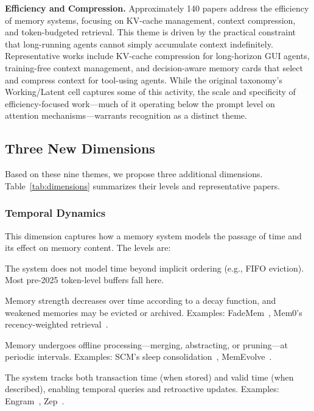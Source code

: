 \textbf{Efficiency and Compression.} Approximately 140 papers address the efficiency of memory systems, focusing on KV-cache management, context compression, and token-budgeted retrieval. This theme is driven by the practical constraint that long-running agents cannot simply accumulate context indefinitely. Representative works include KV-cache compression for long-horizon GUI agents, training-free context management, and decision-aware memory cards that select and compress context for tool-using agents. While the original taxonomy's Working/Latent cell captures some of this activity, the scale and specificity of efficiency-focused work---much of it operating below the prompt level on attention mechanisms---warrants recognition as a distinct theme.

\subsection{Three New Dimensions}

Based on these nine themes, we propose three additional dimensions. Table~\ref{tab:dimensions} summarizes their levels and representative papers.

\subsubsection{Temporal Dynamics}

This dimension captures how a memory system models the passage of time and its effect on memory content. The levels are:

\begin{description}[nosep]
  \item[None.] The system does not model time beyond implicit ordering (e.g., FIFO eviction). Most pre-2025 token-level buffers fall here.
  \item[Decay-based.] Memory strength decreases over time according to a decay function, and weakened memories may be evicted or archived. Examples: FadeMem~\cite{Unknown2026FadeMem}, Mem0's recency-weighted retrieval~\cite{Unknown2025Mem0}.
  \item[Consolidation-based.] Memory undergoes offline processing---merging, abstracting, or pruning---at periodic intervals. Examples: SCM's sleep consolidation~\cite{Unknown2026SCM}, MemEvolve~\cite{Unknown2025MemEvolve}.
  \item[Bi-temporal.] The system tracks both transaction time (when stored) and valid time (when described), enabling temporal queries and retroactive updates. Examples: Engram~\cite{Unknown2026Engram}, Zep~\cite{Unknown2025Zep}.
\end{description}

